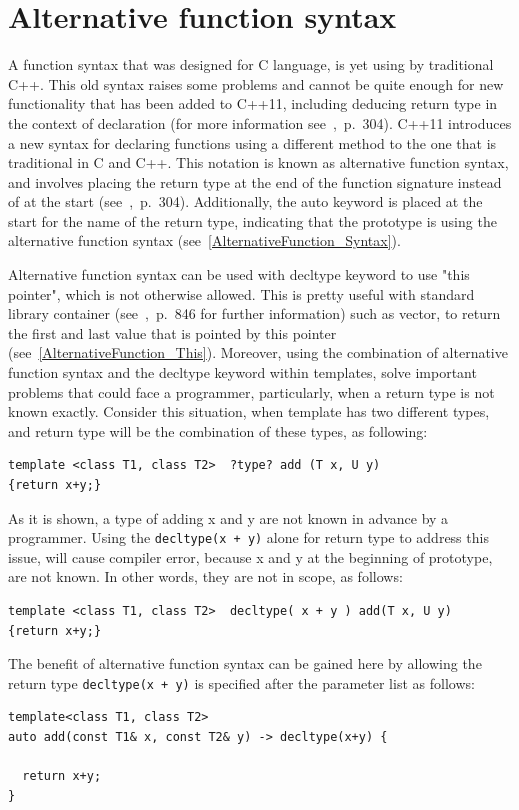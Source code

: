 \documentclass[11pt]{report}
\begin{document}
\section{Alternative function syntax}
\label{section: Alternative function syntax}
A function syntax that was designed for C language, is yet using by traditional C++. This old syntax raises some problems and cannot be quite enough for new functionality that has been added to C++11, including deducing return type in the context of declaration (for more information see~\cite{Gregorie:professionalcpp},~p.~304). C++11 introduces a new syntax for declaring functions using a different method to the one that is traditional in C and C++. This notation is known as alternative function syntax, and involves placing the return type at the end of the function signature instead of at the start (see~\cite{Gregorie:professionalcpp},~p.~304). Additionally, the auto keyword is placed at the start for the name of the return type, indicating that the prototype is using the alternative function syntax (see~\ref{AlternativeFunction_Syntax}).

Alternative function syntax can be used with decltype keyword to use "this pointer", which is not otherwise allowed. This is pretty useful with standard library container (see~\cite{ISO:2011:Cpplanguage},~p.~846 for further information) such as vector, to return the first and last value that is pointed by this pointer (see~\ref{AlternativeFunction_This}). Moreover, using the combination of alternative function syntax and the decltype keyword within templates, solve important problems that could face a programmer, particularly, when a return type is not known exactly. Consider this situation, when template has two different types, and return type will be the combination of these types, as following:
\begin{lstlisting}
template <class T1, class T2>  ?type? add (T x, U y) 
{return x+y;}
\end{lstlisting}
As it is shown, a type of adding x and y are not known in advance by a programmer. Using the \texttt{decltype(x + y)} alone for return type to address this issue, will cause compiler error, because x and y at the beginning of prototype, are not known. In other words, they are not in scope, as follows:
\begin{lstlisting}
template <class T1, class T2>  decltype( x + y ) add(T x, U y)
{return x+y;}
\end{lstlisting}
The benefit of alternative function syntax can be gained here by allowing the return type \texttt{decltype(x + y)} is specified after the parameter list as follows:
\begin{lstlisting}
template<class T1, class T2>
auto add(const T1& x, const T2& y) -> decltype(x+y) {

  return x+y;
}
\end{lstlisting}
\end{document}
